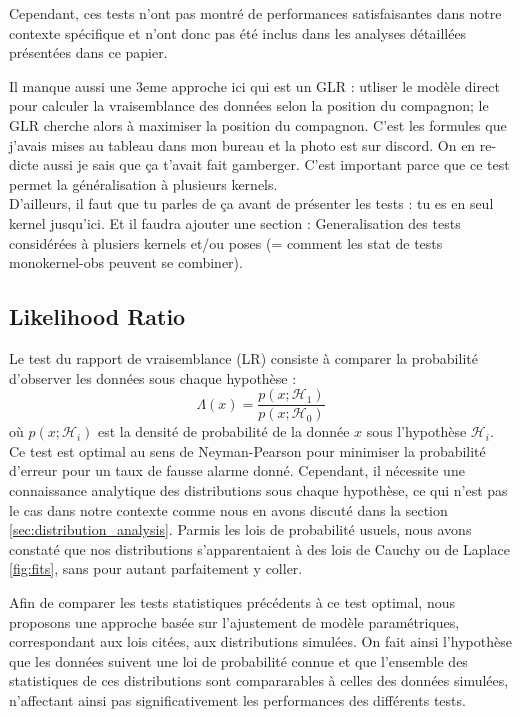 \documentclass{article}
\newcommand{\dm}[1]{{\color{mulberry} #1}}
\begin{document}
Cependant, ces tests n'ont pas montré de performances satisfaisantes dans notre contexte spécifique et n'ont donc pas été inclus dans les analyses détaillées présentées dans ce papier.



\dm{Il manque aussi une 3eme approche  ici qui est un GLR : utliser le modèle direct pour calculer la vraisemblance des données selon la position du compagnon; le GLR cherche alors à maximiser la position du compagnon. C'est les formules que j'avais mises au tableau dans mon bureau et la photo est sur discord. On en re-dicte aussi je sais que ça t'avait fait gamberger. C'est important parce que ce test permet la généralisation à plusieurs kernels. \\
D'ailleurs, il faut que tu parles de ça avant de présenter les tests : tu es en seul kernel jusqu'ici. Et il faudra ajouter  une section : Generalisation des tests considérées à plusiers kernels et/ou poses (= comment les stat de tests monokernel-obs peuvent se combiner).}



\subsection{Likelihood Ratio}
Le test du rapport de vraisemblance (LR) consiste à comparer la probabilité d'observer les données sous chaque hypothèse :
\begin{equation}
    \Lambda(x) = \frac{p(x;\mathcal{H}_1)}{p(x;\mathcal{H}_0)}
\end{equation}
où $p(x;\mathcal{H}_i)$ est la densité de probabilité de la donnée $x$ sous l'hypothèse $\mathcal{H}_i$. Ce test est optimal au sens de Neyman-Pearson pour minimiser la probabilité d'erreur pour un taux de fausse alarme donné. Cependant, il nécessite une connaissance analytique des distributions sous chaque hypothèse, ce qui n'est pas le cas dans notre contexte comme nous en avons discuté dans la section \ref{sec:distribution_analysis}. Parmis les lois de probabilité usuels, nous avons constaté que nos distributions s'apparentaient à des lois de Cauchy ou de Laplace \ref{fig:fits}, sans pour autant parfaitement y coller.

 Afin de comparer les tests statistiques précédents à ce test optimal, nous proposons une approche basée sur l'ajustement de modèle paramétriques, correspondant aux lois citées, aux distributions simulées. On fait ainsi l'hypothèse que les données suivent une loi de probabilité connue et que l'ensemble des statistiques de ces distributions sont compararables à celles des données simulées, n'affectant ainsi pas significativement les performances des différents tests.
\end{document}
